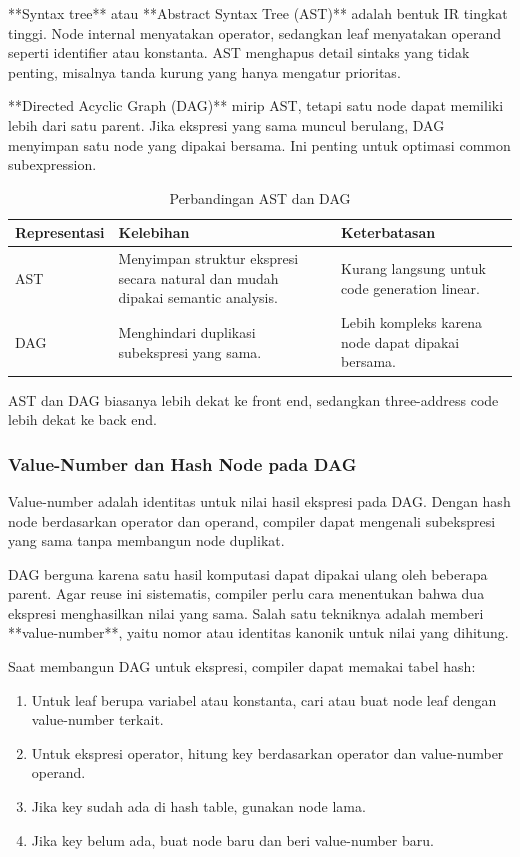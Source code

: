 **Syntax tree** atau **Abstract Syntax Tree (AST)** adalah bentuk IR tingkat tinggi. Node internal menyatakan operator, sedangkan leaf menyatakan operand seperti identifier atau konstanta. AST menghapus detail sintaks yang tidak penting, misalnya tanda kurung yang hanya mengatur prioritas.

**Directed Acyclic Graph (DAG)** mirip AST, tetapi satu node dapat memiliki lebih dari satu parent. Jika ekspresi yang sama muncul berulang, DAG menyimpan satu node yang dipakai bersama. Ini penting untuk optimasi common subexpression.

\begin{table}[H]
\centering
\begin{tabularx}{\textwidth}{|L{0.22\textwidth}|X|X|}
\hline
\textbf{Representasi} & \textbf{Kelebihan} & \textbf{Keterbatasan} \\
\hline
AST & Menyimpan struktur ekspresi secara natural dan mudah dipakai semantic analysis. & Kurang langsung untuk code generation linear. \\
\hline
DAG & Menghindari duplikasi subekspresi yang sama. & Lebih kompleks karena node dapat dipakai bersama. \\
\hline
\end{tabularx}
\caption{Perbandingan AST dan DAG}
\label{tab:ast-dag}
\end{table}

AST dan DAG biasanya lebih dekat ke front end, sedangkan three-address code lebih dekat ke back end.

\subsubsection{Value-Number dan Hash Node pada DAG}

\begin{jawab}
Value-number adalah identitas untuk nilai hasil ekspresi pada DAG. Dengan hash node berdasarkan operator dan operand, compiler dapat mengenali subekspresi yang sama tanpa membangun node duplikat.
\end{jawab}

DAG berguna karena satu hasil komputasi dapat dipakai ulang oleh beberapa parent. Agar reuse ini sistematis, compiler perlu cara menentukan bahwa dua ekspresi menghasilkan nilai yang sama. Salah satu tekniknya adalah memberi **value-number**, yaitu nomor atau identitas kanonik untuk nilai yang dihitung.

Saat membangun DAG untuk ekspresi, compiler dapat memakai tabel hash:
\begin{enumerate}
    \item Untuk leaf berupa variabel atau konstanta, cari atau buat node leaf dengan value-number terkait.
    \item Untuk ekspresi operator, hitung key berdasarkan operator dan value-number operand.
    \item Jika key sudah ada di hash table, gunakan node lama.
    \item Jika key belum ada, buat node baru dan beri value-number baru.
\end{enumerate}


